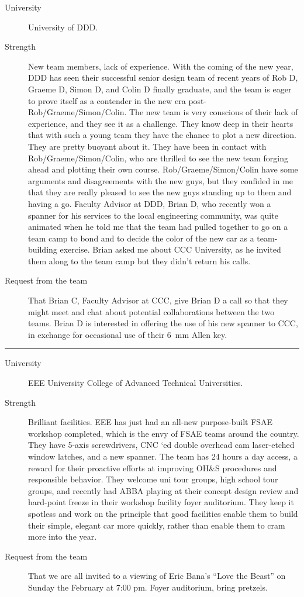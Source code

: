 \documentclass[10pt, a4paper, article, oneside, twocolumn, final]{memoir}
\begin{document}
\begin{description}
    \item[University] University of DDD.
    \item[Strength] New team members, lack of experience. With the coming of the new year, DDD has seen their successful senior design team of recent years of Rob D, Graeme D, Simon D, and Colin D finally graduate, and the team is eager to prove itself as a contender in the new era post-Rob/\allowbreak Graeme/\allowbreak Simon/\allowbreak Colin. The new team is very conscious of their lack of experience, and they see it as a challenge. They know deep in their hearts that with such a young team they have the chance to plot a new direction. They are pretty buoyant about it. They have been in contact with Rob/\allowbreak Graeme/\allowbreak Simon/\allowbreak Colin, who are thrilled to see the new team forging ahead and plotting their own course. Rob/\allowbreak Graeme/\allowbreak Simon/\allowbreak Colin have some arguments and disagreements with the new guys, but they confided in me that they are really pleased to see the new guys standing up to them and having a go. Faculty Advisor at DDD, Brian D, who recently won a spanner for his services to the local engineering community, was quite animated when he told me that the team had pulled together to go on a team camp to bond and to decide the color of the new car as a team-building exercise. Brian asked me about CCC University, as he invited them along to the team camp but they didn’t return his calls. 
    \item[Request from the team] That Brian C, Faculty Advisor at CCC, give Brian D a call so that they might meet and chat about potential collaborations between the two teams. Brian D is interested in offering the use of his new spanner to CCC, in exchange for occasional use of their \SI{6}{\milli\metre} Allen key.
\end{description}

\plainbreak{2}

\begin{description}
    \item[University] EEE University College of Advanced Technical Universities.
    \item[Strength] Brilliant facilities. EEE has just had an all-new purpose-built FSAE workshop completed, which is the envy of FSAE teams around the country. They have 5-axis screwdrivers, CNC ‘ed double overhead cam laser-etched window latches, and a new spanner. The team has 24 hours a day access, a reward for their proactive efforts at improving OH\&S procedures and responsible behavior. They welcome uni tour groups, high school tour groups, and recently had ABBA playing at their concept design review and hard-point freeze in their workshop facility foyer auditorium. They keep it spotless and work on the principle that good facilities enable them to build their simple, elegant car more quickly, rather than enable them to cram more into the year. 
    \item[Request from the team] That we are all invited to a viewing of Eric Bana’s “Love the Beast” on Sunday the  February at 7:00 pm. Foyer auditorium, bring pretzels.
\end{description}
\end{document}
